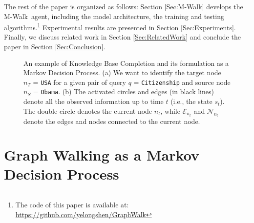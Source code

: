 \documentclass{article}
\newcommand{\mc}{\mathcal}
\newcommand{\modelname}{M-Walk}
\begin{document}
	The rest of the paper is organized as follows: Section \ref{Sec:\modelname} develops the \modelname~agent, including the model architecture, the training and testing algorithms.\footnote{The code of this paper is available at: \url{https://github.com/yelongshen/GraphWalk}} Experimental results are presented in Section \ref{Sec:Experiments}. Finally, we discuss related work in Section \ref{Sec:RelatedWork} and conclude the paper in Section \ref{Sec:Conclusion}.
	
    
    \begin{figure}[t!]
    \centerline{
    }\caption{{\small An example of Knowledge Base Completion and its formulation as a Markov Decision Process. (a) We want to identify the target node $n_T$ = \texttt{USA} for a given pair of query $q$ = \texttt{Citizenship} and source node $n_S$ = \texttt{Obama}. (b) The activated circles and edges (in black lines) denote all the observed information up to time $t$ (i.e., the state $s_t$). The double circle denotes the current node $n_t$, while $\mc{E}_{n_t}$ and $\mc{N}_{n_t}$ denote the edges and nodes connected to the current node.}}
    \end{figure}
	
	
\section{Graph Walking as a Markov Decision Process}
\label{Sec:MDPformulation}
	
\end{document}
